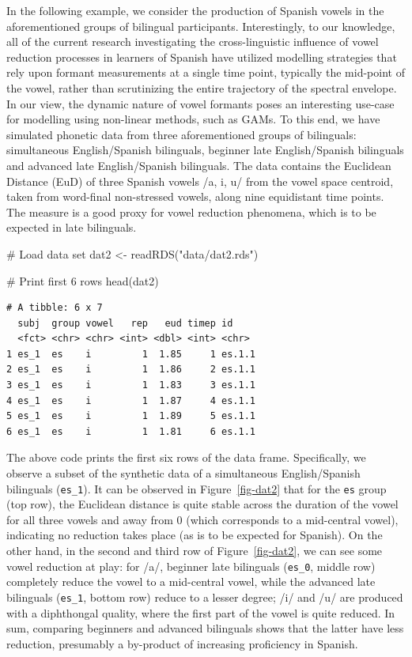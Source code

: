 \documentclass[
  letterpaper,
  DIV=11,
  numbers=noendperiod]{scrartcl}
\newenvironment{Shaded}{\begin{snugshade}}{\end{snugshade}}
\newcommand{\CommentTok}[1]{\textcolor[rgb]{0.37,0.37,0.37}{#1}}
\newcommand{\FunctionTok}[1]{\textcolor[rgb]{0.28,0.35,0.67}{#1}}
\newcommand{\NormalTok}[1]{\textcolor[rgb]{0.00,0.23,0.31}{#1}}
\newcommand{\OtherTok}[1]{\textcolor[rgb]{0.00,0.23,0.31}{#1}}
\newcommand{\StringTok}[1]{\textcolor[rgb]{0.13,0.47,0.30}{#1}}
\begin{document}
In the following example, we consider the production of Spanish vowels
in the aforementioned groups of bilingual participants. Interestingly,
to our knowledge, all of the current research investigating the
cross-linguistic influence of vowel reduction processes in learners of
Spanish have utilized modelling strategies that rely upon formant
measurements at a single time point, typically the mid-point of the
vowel, rather than scrutinizing the entire trajectory of the spectral
envelope. In our view, the dynamic nature of vowel formants poses an
interesting use-case for modelling using non-linear methods, such as
GAMs. To this end, we have simulated phonetic data from three
aforementioned groups of bilinguals: simultaneous English/Spanish
bilinguals, beginner late English/Spanish bilinguals and advanced late
English/Spanish bilinguals. The data contains the Euclidean Distance
(EuD) of three Spanish vowels /a, i, u/ from the vowel space centroid,
taken from word-final non-stressed vowels, along nine equidistant time
points. The measure is a good proxy for vowel reduction phenomena, which
is to be expected in late bilinguals.

\begin{Shaded}
\begin{Highlighting}[]
\CommentTok{\# Load data set}
\NormalTok{dat2 }\OtherTok{\textless{}{-}} \FunctionTok{readRDS}\NormalTok{(}\StringTok{"data/dat2.rds"}\NormalTok{)}

\CommentTok{\# Print first 6 rows}
\FunctionTok{head}\NormalTok{(dat2)}
\end{Highlighting}
\end{Shaded}

\begin{verbatim}
# A tibble: 6 x 7
  subj  group vowel   rep   eud timep id    
  <fct> <chr> <chr> <int> <dbl> <int> <chr> 
1 es_1  es    i         1  1.85     1 es.1.1
2 es_1  es    i         1  1.86     2 es.1.1
3 es_1  es    i         1  1.83     3 es.1.1
4 es_1  es    i         1  1.87     4 es.1.1
5 es_1  es    i         1  1.89     5 es.1.1
6 es_1  es    i         1  1.81     6 es.1.1
\end{verbatim}

The above code prints the first six rows of the data frame.
Specifically, we observe a subset of the synthetic data of a
simultaneous English/Spanish bilinguals (\texttt{es\_1}). It can be
observed in Figure~\ref{fig-dat2} that for the \texttt{es} group (top
row), the Euclidean distance is quite stable across the duration of the
vowel for all three vowels and away from 0 (which corresponds to a
mid-central vowel), indicating no reduction takes place (as is to be
expected for Spanish). On the other hand, in the second and third row of
Figure~\ref{fig-dat2}, we can see some vowel reduction at play: for /a/,
beginner late bilinguals (\texttt{es\_0}, middle row) completely reduce
the vowel to a mid-central vowel, while the advanced late bilinguals
(\texttt{es\_1}, bottom row) reduce to a lesser degree; /i/ and /u/ are
produced with a diphthongal quality, where the first part of the vowel
is quite reduced. In sum, comparing beginners and advanced bilinguals
shows that the latter have less reduction, presumably a by-product of
increasing proficiency in Spanish.
\end{document}
